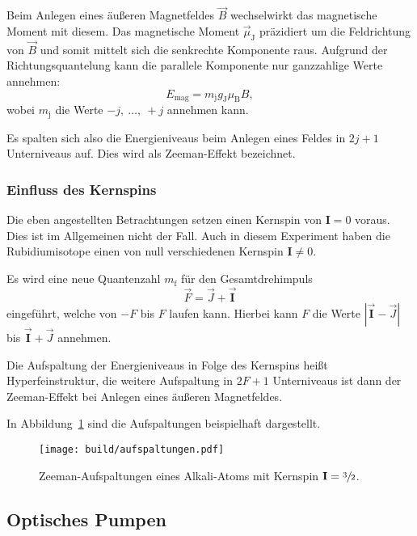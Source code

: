 Beim Anlegen eines äußeren Magnetfeldes $\vec{B}$ wechselwirkt das magnetische Moment mit diesem.
Das magnetische Moment $\vec{\mu}_{\text{J}}$ präzidiert um die Feldrichtung von
$\vec{B}$ und somit mittelt sich die senkrechte Komponente raus.
Aufgrund der Richtungsquantelung kann die parallele Komponente nur ganzzahlige Werte annehmen:
\begin{equation}
  E_\text{mag} = m_\text{j} g_{\text{J}} \mu_\text{B} B,
\end{equation}
wobei $m_\text{j}$ die Werte $-j,~\ldots,~+j$ annehmen kann.

Es spalten sich also die Energieniveaus beim Anlegen eines Feldes in $2j + 1$ Unterniveaus auf.
Dies wird als Zeeman-Effekt bezeichnet.


\subsubsection{Einfluss des Kernspins}%
\label{sub:einfluss_des_kernspins}

Die eben angestellten Betrachtungen setzen einen Kernspin von $\mathbf{I} = 0$
voraus.
Dies ist im Allgemeinen nicht der Fall.
Auch in diesem Experiment haben die Rubidiumisotope einen von null verschiedenen Kernspin
$\mathbf{I} \neq 0$.

Es wird eine neue Quantenzahl $m_\text{f}$ für den Gesamtdrehimpuls
\begin{equation}
  \vec{F} = \vec{J} + \vec{\mathbf{I}}
\end{equation}
eingeführt, welche von $-F$ bis $F$ laufen kann.
Hierbei kann $F$ die Werte
$\left|\vec{\mathbf{I}} - \vec{J}\right|$ bis $\vec{\mathbf{I}} + \vec{J}$
annehmen.

Die Aufspaltung der Energieniveaus in Folge des Kernspins heißt
Hyperfeinstruktur, die weitere Aufspaltung in $2F + 1$ Unterniveaus ist dann
der Zeeman-Effekt bei Anlegen eines äußeren Magnetfeldes.

In Abbildung~\ref{fig:aufspaltungen} sind die Aufspaltungen beispielhaft
dargestellt.

\begin{figure}[ht]
  \centering
  \texttt{[image: build/aufspaltungen.pdf]}
  \caption{%
    Zeeman-Aufspaltungen eines Alkali-Atoms mit Kernspin $\mathbf{I}
    = \sfrac{3}{2}$.\cite{anleitung}%
  }%
  \label{fig:aufspaltungen}
\end{figure}


\subsection{Optisches Pumpen}%
\label{sub:optisches_pumpen}

